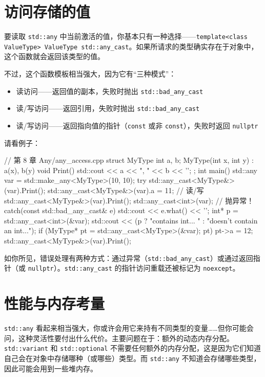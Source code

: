 \section{访问存储的值}

要读取 \texttt{std::any} 中当前激活的值，你基本只有一种选择——\texttt{template<class ValueType> ValueType std::any\_cast}。如果所请求的类型确实存在于对象中，这个函数就会返回该类型的值。

不过，这个函数模板相当强大，因为它有“三种模式”：
\begin{itemize}
\item 读访问——返回值的副本，失败时抛出 \texttt{std::bad\_any\_cast}
\item 读/写访问——返回引用，失败时抛出 \texttt{std::bad\_any\_cast}
\item 读/写访问——返回指向值的指针（\texttt{const} 或非 \texttt{const}），失败时返回 \texttt{nullptr}
\end{itemize}

请看例子：

\begin{codebox}[cpp]
// 第 8 章 Any/any_access.cpp
struct MyType
{
int a, b;
MyType(int x, int y) : a(x), b(y) { }
void Print() { std::cout << a << ", " << b << '\n'; }
};
int main()
{
std::any var = std::make_any<MyType>(10, 10);
try
{
std::any_cast<MyType&>(var).Print();
std::any_cast<MyType&>(var).a = 11; // 读/写
std::any_cast<MyType&>(var).Print();
std::any_cast<int>(var); // 抛异常！
}
catch(const std::bad_any_cast& e)
{
std::cout << e.what() << '\n';
}
int* p = std::any_cast<int>(&var);
std::cout << (p ? "contains int... \n" : "doesn't contain an int...\n");
if (MyType* pt = std::any_cast<MyType>(&var); pt)
{
pt->a = 12;
std::any_cast<MyType&>(var).Print();
}
}
\end{codebox}

如你所见，错误处理有两种方式：通过异常（\texttt{std::bad\_any\_cast}）或通过返回指针（或 \texttt{nullptr}）。\texttt{std::any\_cast} 的指针访问重载还被标记为 \texttt{noexcept}。


\section{性能与内存考量}

\texttt{std::any} 看起来相当强大，你或许会用它来持有不同类型的变量……但你可能会问，这种灵活性要付出什么代价。主要问题在于：额外的动态内存分配。\texttt{std::variant} 和 \texttt{std::optional} 不需要任何额外的内存分配，这是因为它们知道自己会在对象中存储哪种（或哪些）类型。而 \texttt{std::any} 不知道会存储哪些类型，因此可能会用到一些堆内存。

